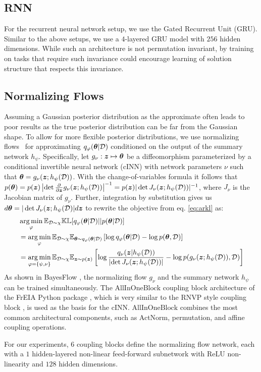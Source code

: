 \subsection{RNN}
For the recurrent neural network setup, we use the Gated Recurrent Unit (GRU). Similar to the above setups, we use a $4$-layered GRU model with $256$ hidden dimensions. While such an architecture is not permutation invariant, by training on tasks that require such invariance could encourage learning of solution structure that respects this invariance.

\subsection{Normalizing Flows}
\label{subsec:flows}
Assuming a Gaussian posterior distribution as the approximate often leads to poor results as the true posterior distribution can be far from the Gaussian shape. To allow for more flexible posterior distributions, we use normalizing flows~\citep{kingma2018glow,kobyzev2020normalizing,papamakarios2021normalizing,rezende2015variational} for approximating $q_\varphi({\bm{\theta}} | {\mathcal{D}})$ conditioned on the output of the summary network $h_\psi$. Specifically, let $g_\nu: {\bm{z}} \mapsto {\bm{\theta}}$ be a diffeomorphism parameterized by a conditional invertible neural network (cINN) with network parameters $\nu$ such that ${\bm{\theta}} = g_\nu({\bm{z}}; h_\psi({\mathcal{D}}))$. With the change-of-variables formula it follows that $p({\bm{\theta}})=p({\bm{z}})\left|\det \frac{\partial}{\partial{\bm{z}}}g_\nu({\bm{z}}; h_\psi({\mathcal{D}}))\right|^{-1} = p({\bm{z}})|\det J_\nu({\bm{z}}; h_\psi({\mathcal{D}}))|^{-1}$, where $J_\nu$ is the Jacobian matrix of $g_\nu$. Further, integration by substitution gives us $d{\bm{\theta}} = |\det J_\nu({\bm{z}}; h_\psi({\mathcal{D}})| d{\bm{z}}$ to rewrite the objective from eq. \ref{eq:arkl} as:
\begin{align}
    &\operatorname*{arg\,min}_\varphi {\mathbb{E}}_{{\mathcal{D}} \sim \chi} {\mathbb{K}}{\mathbb{L}}[q_\varphi({\bm{\theta}}|{\mathcal{D}}) || p({\bm{\theta}}|{\mathcal{D}})]\\
    &= \operatorname*{arg\,min}_\varphi {\mathbb{E}}_{{\mathcal{D}} \sim \chi} {\mathbb{E}}_{{\bm{\theta}} \sim q_\varphi({\bm{\theta}}|{\mathcal{D}})} \left[ \log q_\varphi({\bm{\theta}}|{\mathcal{D}}) - \log p({\bm{\theta}}, {\mathcal{D}}) \right]\\
    &= \operatorname*{arg\,min}_{\varphi=\{\psi, \nu\}} {\mathbb{E}}_{{\mathcal{D}} \sim \chi} {\mathbb{E}}_{{\bm{z}} \sim p({\bm{z}})} \left[ \log \frac{q_\nu ({\bm{z}}|h_\psi({\mathcal{D}}))}{\left| \det J_\nu({\bm{z}}; h_\psi({\mathcal{D}})) \right|} - \log p(g_\nu({\bm{z}}; h_\psi({\mathcal{D}})), {\mathcal{D}}) \right]
\end{align}
As shown in BayesFlow \citep{radev2020bayesflow}, the normalizing flow $g_\nu$ and the summary network $h_\psi$ can be trained simultaneously. The $\mathrm{AllInOneBlock}$ coupling block architecture of the FrEIA Python package \citep{Ardizzone2018freia}, which is very similar to the RNVP style coupling block \citep{Dinh2017rnvp}, is used as the basis for the cINN. $\mathrm{AllInOneBlock}$ combines the most common architectural components, such as ActNorm, permutation, and affine coupling operations.

For our experiments, $6$ coupling blocks define the normalizing flow network, each with a $1$ hidden-layered non-linear feed-forward subnetwork with ReLU non-linearity and $128$ hidden dimensions.